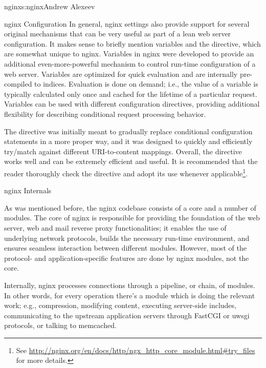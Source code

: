 \begin{aosachapter}{nginx}{s:nginx}{Andrew Alexeev}
\begin{aosasect1}{nginx Configuration}
In general, nginx settings also provide support for several original
mechanisms that can be very useful as part of a lean web server
configuration. It makes sense to briefly mention variables and the
 directive, which are somewhat unique to
nginx. Variables in nginx were developed to provide an additional 
even-more-powerful mechanism to control run-time configuration of a web
server. Variables are optimized for quick evaluation and are
internally pre-compiled to indices. Evaluation is done on demand;
i.e., the value of a variable is typically calculated only once and
cached for the lifetime of a particular request. Variables can be used
with different configuration directives, providing additional
flexibility for describing conditional request processing
behavior. 

The  directive was initially meant to
gradually replace conditional  configuration statements in a
more proper way, and it was designed to quickly and efficiently
try/match against different URI-to-content mappings. Overall, the
 directive works well and can be extremely efficient
and useful. It is recommended that the reader thoroughly check the
 directive and adopt its use whenever
applicable\footnote{See
  \url{http://nginx.org/en/docs/http/ngx_http_core_module.html\#try_files}
  for more details.}.

\end{aosasect1}

\begin{aosasect1}{nginx Internals} \label{sec.nginx.internals}

As was mentioned before, the nginx codebase consists of a core and a
number of modules. The core of nginx is responsible for providing the
foundation of the web server, web and mail reverse proxy
functionalities; it enables the use of underlying network protocols,
builds the necessary run-time environment, and ensures seamless
interaction between different modules. However, most of the protocol-
and application-specific features are done by nginx modules, not the
core.

Internally, nginx processes connections through a pipeline, or chain,
of modules. In other words, for every operation there's a module which
is doing the relevant work; e.g., compression, modifying content,
executing server-side includes, communicating to the upstream
application servers through FastCGI or uwsgi protocols, or talking to
memcached.


\end{aosasect1}
\end{aosachapter}
